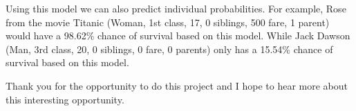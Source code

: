 \documentclass[
  11pt,
]{article}
\begin{document}
Using this model we can also predict individual probabilities. For
example, Rose from the movie Titanic (Woman, 1st class, 17, 0 siblings,
500 fare, 1 parent) would have a 98.62\% chance of survival based on
this model. While Jack Dawson (Man, 3rd class, 20, 0 siblings, 0 fare, 0
parents) only has a 15.54\% chance of survival based on this model.

Thank you for the opportunity to do this project and I hope to hear more
about this interesting opportunity.
\end{document}
